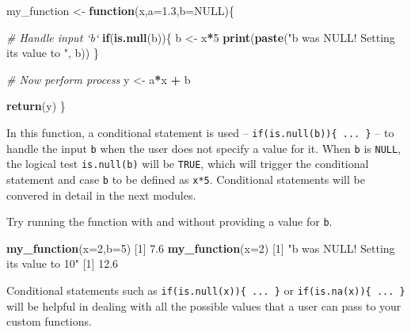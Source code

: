 \documentclass[]{book}
\newenvironment{Shaded}{\begin{snugshade}}{\end{snugshade}}
\newcommand{\CommentTok}[1]{\textcolor[rgb]{0.56,0.35,0.01}{\textit{#1}}}
\newcommand{\ControlFlowTok}[1]{\textcolor[rgb]{0.13,0.29,0.53}{\textbf{#1}}}
\newcommand{\DataTypeTok}[1]{\textcolor[rgb]{0.13,0.29,0.53}{#1}}
\newcommand{\DecValTok}[1]{\textcolor[rgb]{0.00,0.00,0.81}{#1}}
\newcommand{\FloatTok}[1]{\textcolor[rgb]{0.00,0.00,0.81}{#1}}
\newcommand{\KeywordTok}[1]{\textcolor[rgb]{0.13,0.29,0.53}{\textbf{#1}}}
\newcommand{\NormalTok}[1]{#1}
\newcommand{\OperatorTok}[1]{\textcolor[rgb]{0.81,0.36,0.00}{\textbf{#1}}}
\newcommand{\OtherTok}[1]{\textcolor[rgb]{0.56,0.35,0.01}{#1}}
\newcommand{\StringTok}[1]{\textcolor[rgb]{0.31,0.60,0.02}{#1}}
\begin{document}
\begin{Shaded}
\begin{Highlighting}[]
\NormalTok{my_function <-}\StringTok{ }\ControlFlowTok{function}\NormalTok{(x,}\DataTypeTok{a=}\FloatTok{1.3}\NormalTok{,}\DataTypeTok{b=}\OtherTok{NULL}\NormalTok{)\{}
  
  \CommentTok{# Handle input `b`}
  \ControlFlowTok{if}\NormalTok{(}\KeywordTok{is.null}\NormalTok{(b))\{}
\NormalTok{    b <-}\StringTok{ }\NormalTok{x}\OperatorTok{*}\DecValTok{5}
    \KeywordTok{print}\NormalTok{(}\KeywordTok{paste}\NormalTok{(}\StringTok{"b was NULL! Setting its value to "}\NormalTok{, b))}
\NormalTok{  \}}
  
  \CommentTok{# Now perform process}
\NormalTok{  y <-}\StringTok{ }\NormalTok{a}\OperatorTok{*}\NormalTok{x }\OperatorTok{+}\StringTok{ }\NormalTok{b}
  
  \KeywordTok{return}\NormalTok{(y)}
\NormalTok{\}}
\end{Highlighting}
\end{Shaded}

In this function, a conditional statement is used -- \texttt{if(is.null(b))\{\ ...\ \}} -- to handle the input \texttt{b} when the user does not specify a value for it. When \texttt{b} is \texttt{NULL}, the logical test \texttt{is.null(b)} will be \texttt{TRUE}, which will trigger the conditional statement and case \texttt{b} to be defined as \texttt{x*5}. Conditional statements will be convered in detail in the next modules.

Try running the function with and without providing a value for \texttt{b}.

\begin{Shaded}
\begin{Highlighting}[]
\KeywordTok{my_function}\NormalTok{(}\DataTypeTok{x=}\DecValTok{2}\NormalTok{,}\DataTypeTok{b=}\DecValTok{5}\NormalTok{)}
\NormalTok{[}\DecValTok{1}\NormalTok{] }\FloatTok{7.6}
\KeywordTok{my_function}\NormalTok{(}\DataTypeTok{x=}\DecValTok{2}\NormalTok{)}
\NormalTok{[}\DecValTok{1}\NormalTok{] }\StringTok{"b was NULL! Setting its value to  10"}
\NormalTok{[}\DecValTok{1}\NormalTok{] }\FloatTok{12.6}
\end{Highlighting}
\end{Shaded}

Conditional statements such as \texttt{if(is.null(x))\{\ ...\ \}} or \texttt{if(is.na(x))\{\ ...\ \}} will be helpful in dealing with all the possible values that a user can pass to your custom functions.
\end{document}
